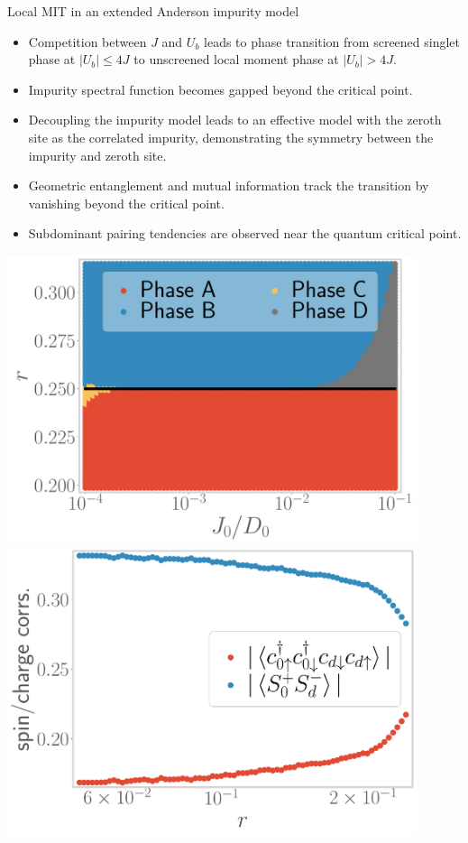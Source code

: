 \documentclass[8pt,aspectratio=169]{beamer}
\begin{document}
\begin{frame}{Local MIT in an extended Anderson impurity model}
\hspace*{-40pt}
\begin{minipage}{0.65\textwidth}
\begin{itemize}
\item Competition between $J$ and $U_b$ leads to phase transition from screened singlet phase at \(|U_b| \leq 4J\) to unscreened local moment phase at \(|U_b| > 4J\).
\item Impurity spectral function becomes gapped beyond the critical point.
\item Decoupling the impurity model leads to an effective model with the zeroth site as the correlated impurity, demonstrating the symmetry between the impurity and zeroth site.
\item Geometric entanglement and mutual information track the transition by vanishing beyond the critical point.
\item Subdominant pairing tendencies are observed near the quantum critical point.
\end{itemize}
\end{minipage}
\hspace*{5pt}
\begin{minipage}{0.41\textwidth}
\includegraphics[width=0.9\textwidth]{phase-map-MIT.pdf}
\includegraphics[width=0.9\textwidth]{odlro_d0.pdf}
\end{minipage}
\hspace*{-40pt}
\end{frame}
\end{document}
